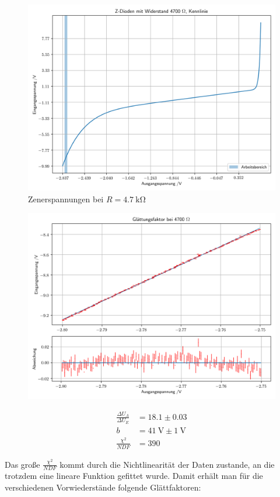 \documentclass[12pt,twoside,a4paper]{scrartcl}
\begin{document}
				\begin{figure}
					\includegraphics{Plots/zener/spannungenZener_4700}
					\caption{Zenerspannungen bei $R = \SI{4.7}{\kilo \ohm} $}
				\end{figure}

				\begin{figure}[H]
					\begin{minipage}{0.69 \textwidth}
						\includegraphics[width = \textwidth]{Plots/zener/diff_res_4700}
					\end{minipage}
					\begin{minipage}{0.29 \textwidth}
						\begin{align*}
							\frac{\Delta U_A}{\Delta U_E} &= 18.1 \pm 0.03 \\
							b &= \SI{41}{ \volt } \pm \SI{1}{\volt} \\
							\frac{\chi^2}{NDF} &= 390
						\end{align*}
					\end{minipage}
				\end{figure}
				Das große $\frac{\chi^2}{NDF}$ kommt durch die Nichtlinearität der Daten zustande, an die trotzdem eine lineare Funktion gefittet wurde.
				Damit erhält man für die verschiedenen Vorwiederstände folgende Glättfaktoren:
\end{document}
